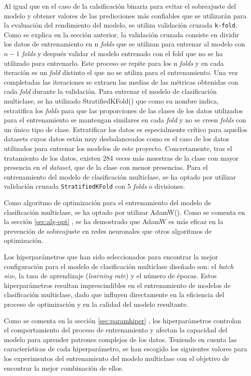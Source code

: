 Al igual que en el caso de la calsificación binaria para evitar el sobreajuste del modelo y obtener valores de las predicciones más confiables que se utilizarán para la evaluación del rendimiento del modelo, se utiliza validación cruzada \texttt{k-fold}. Como se explica en la sección anterior, la validación cruzada consiste en dividir los datos de entrenamiento en n \textit{folds} que se utilizan para entrenar al modelo con $n-1$ \textit{folds} y después validar el modelo entrenado con el fold que no se ha utilizado para entrenarlo. Este proceso se repite para los n \textit{folds} y en cada iteración es un \textit{fold} distinto el que no se utiliza para el entrenamiento. Una vez completadas las iteraciones se extraen las medias de las métricas obtenidas con cada \textit{fold} durante la validación. Para entrenar el modelo de clasificación multiclase, se ha utilizado StratifiedKFold() que como su nombre indica, estratifica los \textit{folds} para que las proporciones de las clases de los datos utilizados para el entrenamiento se mantengan similares en cada \textit{fold} y no se creen \textit{folds} con un único tipo de clase. Estratificar los datos es especialmente crítico para aquellos datasets cuyos datos están muy desbalanceados como es el caso de los datos utilizados para entrenar los modelos de este proyecto. Concretamente, tras el tratamiento de los datos, existen 284 veces más muestras de la clase con mayor presencia en el \textit{dataset}, que de la clase con menor presencias. Para el entrenamiento del modelo de clasificación multiclase, se ha optado por utilizar validación cruzada \texttt{StratifiedKFold} con 5 \textit{folds} o divisiones.

Como algoritmo de optimización para el entrenamiento del modelo de clasificación multiclase, se ha optado por utilizar AdamW(). Como se comenta en la sección \ref{sec:alg-opt} , se ha demostrado que AdamW es más eficaz en la prevención de sobreajuste en redes neuronales que otros algoritmos de optimización.

Los hiperparámetros que han sido seleccionados para encontrar la mejor configuración para el modelo de clasificación multiclase diseñado son: el \textit{batch size}, la tasa de aprendizaje (\textit{learning rate}) y el número de épocas. Estos hiperparámetros resultan imprescindibles en el entrenamiento de modelos de clasificación multiclase, dado que influyen directamente en la eficiencia del proceso de optimización y en la calidad del modelo resultante.

Como se comenta en la sección \ref{sec:paramhiper} , los hiperparámetros controlan el comportamiento del proceso de entrenamiento y afectan la capacidad del modelo para aprender patrones complejos de los datos. Teniendo en cuenta las características de cada hiperparámetro, se han escogido los siguientes valores para los experimentos del entrenamiento del modelo multiclase con el objetivo de encontrar la mejor combinación de ellos.

